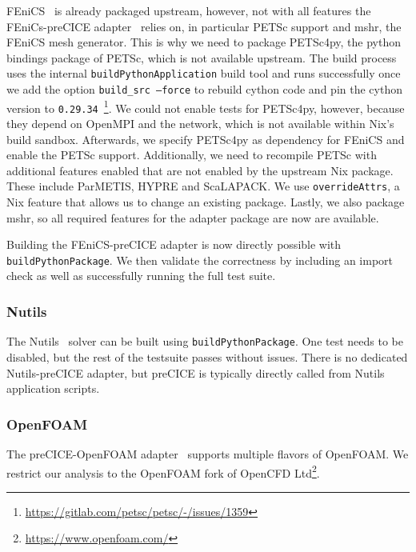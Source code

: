 \documentclass{eceasst}
\begin{document}
FEniCS~\cite{fenics} is already packaged upstream, however, not with all features the FEniCs-preCICE adapter~\cite{Rodenberg2021} relies on, in particular PETSc support and mshr, the FEniCS mesh generator.
This is why we need to package PETSc4py, the python bindings package of PETSc, which is not available upstream.
The build process uses the internal \texttt{buildPythonApplication} build tool and runs successfully once we add the option \texttt{build\_src --force} to rebuild cython code and pin the cython version to \texttt{0.29.34}~\footnote{\url{https://gitlab.com/petsc/petsc/-/issues/1359}}.
We could not enable tests for PETSc4py, however, because they depend on OpenMPI and the network, which is not available within Nix's build sandbox.
Afterwards, we specify PETSc4py as dependency for FEniCS and enable the PETSc support.
Additionally, we need to recompile PETSc with additional features enabled that are not enabled by the upstream Nix package. These include ParMETIS, HYPRE and ScaLAPACK. We use \texttt{overrideAttrs}, a Nix feature that allows us to change an existing package.
Lastly, we also package mshr, so all required features for the adapter package are now are available.

Building the FEniCS-preCICE adapter is now directly possible with \texttt{buildPythonPackage}.
We then validate the correctness by including an import check as well as successfully running the full test suite.

\subsubsection{Nutils}

The Nutils~\cite{nutils} solver can be built using \texttt{buildPythonPackage}. One test needs to be disabled, but the rest of the testsuite passes without issues. There is no dedicated Nutils-preCICE adapter, but preCICE is typically directly called from Nutils application scripts.

\subsubsection{OpenFOAM}

The preCICE-OpenFOAM adapter~\cite{OpenFOAMpreCICE} supports multiple flavors of OpenFOAM. We restrict our analysis to the OpenFOAM fork of OpenCFD Ltd\footnote{\url{https://www.openfoam.com/}}.
\end{document}

